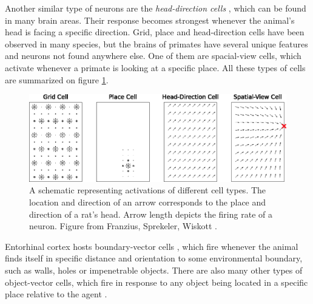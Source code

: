 \documentclass[oneside,english,logo]{amuthesis}
\begin{document}
Another similar type of neurons are the \textit{head-direction cells} \cite{HD_cells}, which can be found in many brain areas. Their response becomes strongest whenever the animal's head is facing a specific direction. Grid, place and head-direction cells have been observed in many species, but the brains of primates have several unique features and neurons not found anywhere else. One of them are spacial-view cells, which activate whenever a primate is looking at a specific place. All these types of cells are summarized on figure  \ref{fig:place_grid_head_view_cells}.
\begin{figure}[!htbp]
	\centering
	\includegraphics[width=12cm]{place_grid_head_view_cells}
	\caption{A schematic representing activations of different cell types. The location and direction of an arrow corresponds to the place and direction of a rat's head. Arrow length depicts the firing rate of a neuron. Figure from  Franzius, Sprekeler, Wiskott \cite{slowness_sparseness}.}
	\label{fig:place_grid_head_view_cells}
\end{figure}

Entorhinal cortex hosts boundary-vector cells \cite{BVC}, which fire whenever the animal finds itself in specific distance and orientation to some environmental boundary, such as walls, holes or impenetrable objects.  There are also many other types of object-vector cells, which fire in response to any object being located in a specific place relative to the agent \cite{vector_trace_cells}.
\end{document}
